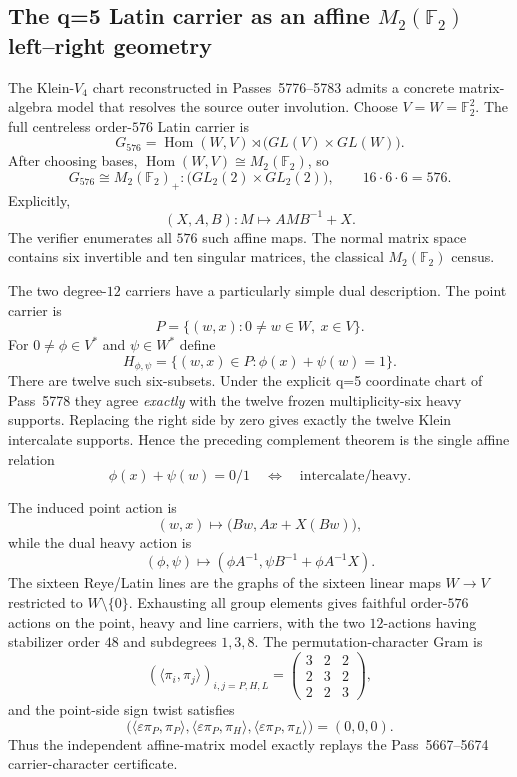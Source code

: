 \subsection{The q=5 Latin carrier as an affine $M_2(\mathbb F_2)$ left--right geometry}
\label{sec:pass5792-5799-matrix-ring-transpose}

The Klein-$V_4$ chart reconstructed in Passes~5776--5783 admits a concrete
matrix-algebra model that resolves the source outer involution.  Choose
$V=W=\mathbb F_2^2$.  The full centreless order-$576$ Latin carrier is
\[
 \boxed{
 G_{576}=\operatorname{Hom}(W,V)\rtimes
 \bigl(GL(V)\times GL(W)\bigr).
 }
\]
After choosing bases,
$\operatorname{Hom}(W,V)\cong M_2(\mathbb F_2)$, so
\[
 \boxed{
 G_{576}\cong
 M_2(\mathbb F_2)_{+}:\bigl(GL_2(2)\times GL_2(2)\bigr),
 \qquad16\cdot6\cdot6=576.
 }
\]
Explicitly,
\[
 (X,A,B):M\longmapsto AMB^{-1}+X.
\]
The verifier enumerates all $576$ such affine maps.  The normal matrix space
contains six invertible and ten singular matrices, the classical
$M_2(\mathbb F_2)$ census.

The two degree-$12$ carriers have a particularly simple dual description.  The
point carrier is
\[
 \boxed{P=\{(w,x):0\ne w\in W,\ x\in V\}.}
\]
For $0\ne\phi\in V^*$ and $\psi\in W^*$ define
\[
 \boxed{
 H_{\phi,\psi}=\{(w,x)\in P:\phi(x)+\psi(w)=1\}.
 }
\]
There are twelve such six-subsets.  Under the explicit q=5 coordinate chart of
Pass~5778 they agree \emph{exactly} with the twelve frozen multiplicity-six
heavy supports.  Replacing the right side by zero gives exactly the twelve
Klein intercalate supports.  Hence the preceding complement theorem is the
single affine relation
\[
 \boxed{
 \phi(x)+\psi(w)=0/1
 \quad\Longleftrightarrow\quad
 \text{intercalate/heavy}.
 }
\]

The induced point action is
\[
 (w,x)\longmapsto\bigl(Bw,Ax+X(Bw)\bigr),
\]
while the dual heavy action is
\[
 (\phi,\psi)\longmapsto
 \left(\phi A^{-1},\psi B^{-1}+\phi A^{-1}X\right).
\]
The sixteen Reye/Latin lines are the graphs of the sixteen linear maps
$W\to V$ restricted to $W\setminus\{0\}$.  Exhausting all group elements gives
faithful order-$576$ actions on the point, heavy and line carriers, with the
two $12$-actions having stabilizer order $48$ and subdegrees $1,3,8$.  The
permutation-character Gram is
\[
 \boxed{
 \left(\langle\pi_i,\pi_j\rangle\right)_{i,j=P,H,L}
 =\begin{pmatrix}3&2&2\\2&3&2\\2&2&3\end{pmatrix},
 }
\]
and the point-side sign twist satisfies
\[
 \boxed{
 \bigl(
 \langle\varepsilon\pi_P,\pi_P\rangle,
 \langle\varepsilon\pi_P,\pi_H\rangle,
 \langle\varepsilon\pi_P,\pi_L\rangle
 \bigr)=(0,0,0).
 }
\]
Thus the independent affine-matrix model exactly replays the Pass~5667--5674
carrier-character certificate.

